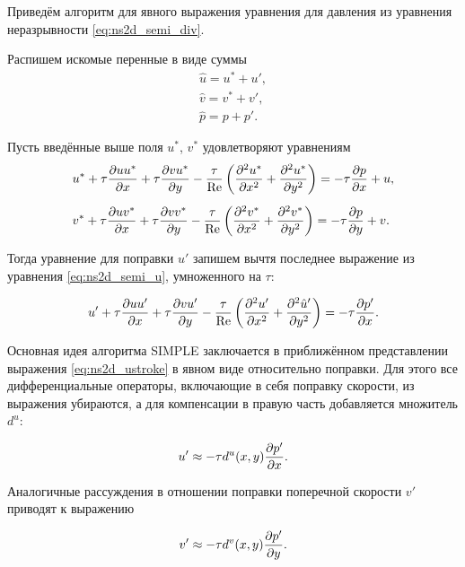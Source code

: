 \label{sec:simple-algo}

Приведём алгоритм для явного выражения уравнения для давления из
уравнения неразрывности \eqref{eq:ns2d_semi_div}.

Распишем искомые перенные в виде суммы 
\begin{equation}
    \label{eq:ns2d_decomp}
\begin{array}{l}
    \hat u = u^* + u',\\
    \hat v = v^* + v',\\
    \hat p = p + p'.
\end{array}
\end{equation}

Пусть введённые выше поля $u^*$, $v^*$ удовлетворяют уравнениям
\begin{align}
    \label{eq:ns2d_ustar}
    &u^* + \tau\frac{\partial u u^*}{\partial x} + \tau\frac{\partial v u^*}{\partial y}
       - \frac{\tau}{\mathrm{Re}}\left(\frac{\partial^2 u^*}{\partial x^2} + \frac{\partial^2 u^*}{\partial y^2}\right)
       = -\tau\frac{\partial p}{\partial x} + u, \\[5pt]
    \label{eq:ns2d_vstar}
    &v^* + \tau\frac{\partial u v^*}{\partial x} + \tau\frac{\partial v v^*}{\partial y}
       - \frac{\tau}{\mathrm{Re}}\left(\frac{\partial^2 v^*}{\partial x^2} + \frac{\partial^2 v^*}{\partial y^2}\right)
       = -\tau\frac{\partial p}{\partial y} + v.
\end{align}

Тогда уравнение для поправки $u'$ запишем вычтя последнее выражение из
уравнения \eqref{eq:ns2d_semi_u}, умноженного на $\tau$:

\begin{equation}
    \label{eq:ns2d_ustroke}
    u' + \tau\frac{\partial u u'}{\partial x} + \tau\frac{\partial v u'}{\partial y}
       - \frac{\tau}{\mathrm{Re}}\left(\frac{\partial^2 u'}{\partial x^2} + \frac{\partial^2 \hat u'}{\partial y^2}\right)
       = -\tau\frac{\partial p'}{\partial x}.
\end{equation}

Основная идея алгоритма SIMPLE заключается в приближённом представлении выражения \eqref{eq:ns2d_ustroke}
в явном виде относительно поправки. Для этого все дифференциальные операторы, включающие в себя поправку скорости,
из выражения убираются, а для компенсации в правую часть добавляется множитель $d^u$:

\begin{equation}
    \label{eq:ns2d_ustroke_approx}
    u' \approx -\tau d^u(x, y) \frac{\partial p'}{\partial x}.
\end{equation}

Аналогичные рассуждения в отношении поправки поперечной скорости $v'$ приводят к выражению

\begin{equation}
    \label{eq:ns2d_vstroke_approx}
    v' \approx -\tau d^v(x, y) \frac{\partial p'}{\partial y}.
\end{equation}

